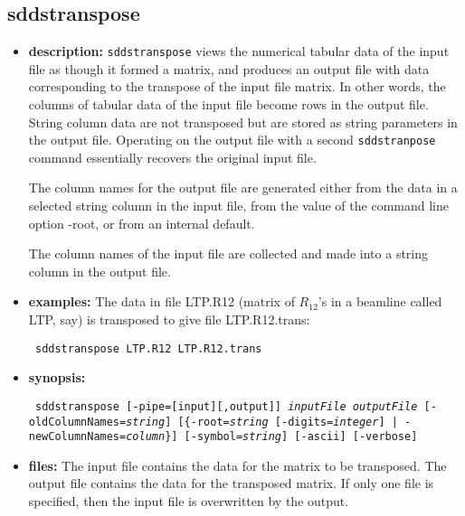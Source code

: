 %
%
%
%
\newpage

%
%
\subsection{sddstranspose}
\label{sddstranspose}

\begin{itemize}
\item {\bf description:}
%
%
\verb+sddstranspose+ views the numerical tabular data of the input file
as though it formed a matrix, and produces an output
file with data corresponding to the transpose of the input
file matrix. In other words, the columns of tabular data of the input
file become rows in the output file. String column data
are not transposed but are stored as string parameters in the output file.
Operating on the output file with a second \verb+sddstranpose+ command essentially recovers
the original input file.

The column names for the output file are generated either from the data in
a selected string column in the input file,
from the value of the command line option -root,
or from an internal default.

The column names of the input file are collected and made into
a string column in the output file.

\item {\bf examples:} 
%
% 
%
The data in file LTP.R12 (matrix of $R_{12}$'s in a beamline called LTP, say)
is transposed to give file LTP.R12.trans:
\begin{flushleft}{\tt
sddstranspose LTP.R12 LTP.R12.trans
}\end{flushleft}
\item {\bf synopsis:} 
%
%
\begin{flushleft}{\tt
sddstranspose [-pipe=[input][,output]] {\em inputFile} {\em outputFile}
     [-oldColumnNames={\em string}] [\{-root={\em string} [-digits={\em integer}] | 
     -newColumnNames={\em column}\}] 
     [-symbol={\em string}] [-ascii] [-verbose]
}\end{flushleft}
\item {\bf files:}
The input file contains the data for the matrix to be transposed. The output file
contains the data for the transposed matrix. If only one file is specified,
then the input file is overwritten by the output.



\end{itemize}
